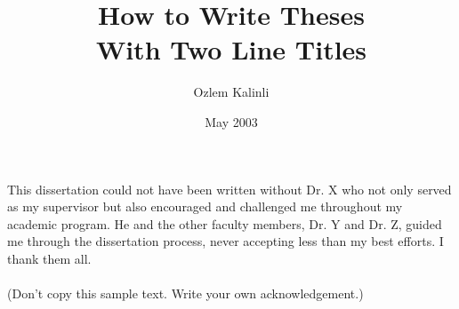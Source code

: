 \documentclass{iitthesis}
\begin{document}
\title{How to Write Theses\\
  With Two Line Titles}
\author{Ozlem Kalinli}
\date{May 2003}
\copyrightnoticetrue      %
\maketitle                %


\prelimpages         %


\begin{acknowledgement}     %
\par  This dissertation could not have been written without Dr. X
who not only served as my supervisor but also encouraged and
challenged me throughout my academic program. He and the other
faculty members, Dr. Y and Dr. Z, guided me through the
dissertation process, never accepting less than my best efforts. I
thank them all.\\ \\ (Don't copy this sample text. Write your own
acknowledgement.)
\end{acknowledgement}


\tableofcontents
\clearpage

\listoftables

\clearpage

\listoffigures

\clearpage


\listofsymbols


 \clearpage



\begin{abstract}           %
\end{abstract}
\end{document}
